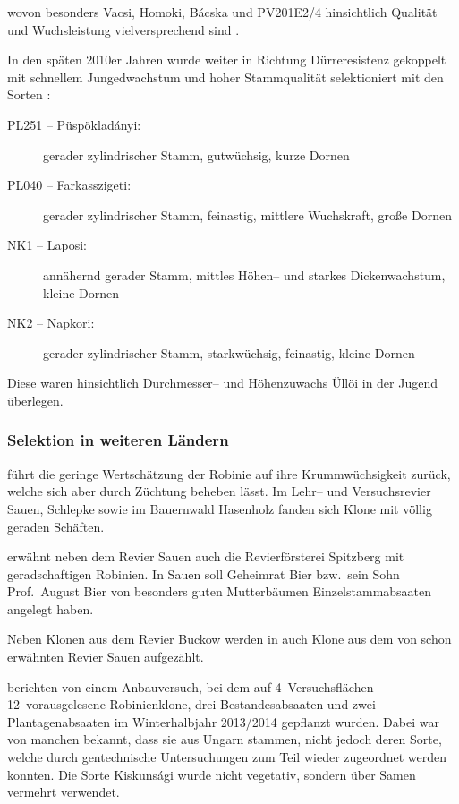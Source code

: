 \documentclass[twocolumn]{scrartcl}
\begin{document}
wovon besonders Vacsi, Homoki, Bácska und PV201E2/4 hinsichtlich Qualität und Wuchsleistung vielversprechend
sind \citep{redei2018robinieImprovement,keserue2021robinie,abri2023robinieUngarn,abri2024dis}.

In den späten 2010er Jahren wurde weiter in Richtung Dürreresistenz
gekoppelt mit schnellem Jungedwachstum und hoher Stammqualität
selektioniert mit den Sorten \citep{abri2023robinieUngarn,abri2024dis}:

\begin{description}
  \item[PL251 -- Püspökladányi:] gerader zylindrischer Stamm, gutwüchsig, kurze Dornen
  \item[PL040 -- Farkasszigeti:] gerader zylindrischer Stamm, feinastig, mittlere Wuchskraft, große Dornen
  \item[NK1 -- Laposi:] annähernd gerader Stamm, mittles Höhen-- und starkes Dickenwachstum, kleine Dornen
  \item[NK2 -- Napkori:] gerader zylindrischer Stamm, starkwüchsig,
feinastig, kleine Dornen
\end{description}
Diese waren hinsichtlich Durchmesser-- und Höhenzuwachs Üllöi in der
Jugend überlegen.

\subsubsection{Selektion in weiteren Ländern}

\citet{schroeck1953robine} führt die geringe Wertschätzung der Robinie
auf ihre Krummwüchsigkeit zurück, welche sich aber durch Züchtung
beheben lässt. Im Lehr-- und Versuchsrevier Sauen, Schlepke sowie im
Bauernwald Hasenholz fanden sich Klone mit völlig geraden Schäften.

\citet{erteld1952robinieErtrag} erwähnt neben dem Revier Sauen auch
die Revierförsterei Spitzberg mit geradschaftigen Robinien.  In Sauen
soll Geheimrat Bier bzw.\ sein Sohn Prof.\ August Bier von besonders
guten Mutterbäumen Einzelstammabsaaten angelegt haben.

Neben Klonen aus dem Revier Buckow werden in
\citet{naujoks2005robinie} auch Klone aus dem von
\citet{schroeck1953robine} schon erwähnten Revier Sauen aufgezählt.

\citet{naujoks2005robinie,hofmann2020robinie,lange2021robinie,lange2022robinie}
berichten von einem Anbauversuch, bei dem auf 4~Versuchsflächen
12~vorausgelesene Robinienklone, drei Bestandesabsaaten und zwei
Plantagenabsaaten im Winterhalbjahr 2013/2014 gepflanzt wurden. Dabei
war von manchen bekannt, dass sie aus Ungarn stammen, nicht jedoch
deren Sorte, welche durch gentechnische Untersuchungen zum Teil wieder
zugeordnet werden konnten. Die Sorte Kiskunsági wurde nicht vegetativ,
sondern über Samen vermehrt verwendet.
\end{document}

